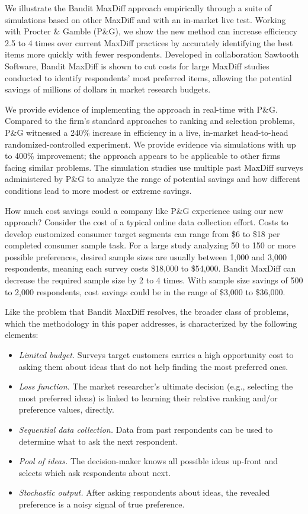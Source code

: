 \documentclass[nonblindrev]{informs3}
\begin{document}
We illustrate the Bandit MaxDiff approach empirically through a suite of simulations based on other MaxDiff and with an in-market live test. Working with Procter \& Gamble (P\&G), we show the new method can increase efficiency 2.5 to 4 times over current MaxDiff practices by accurately identifying the best items more quickly with fewer respondents. Developed in collaboration Sawtooth Software, Bandit MaxDiff is shown to cut costs for large MaxDiff studies conducted to identify respondents’ most preferred items, allowing the potential savings of millions of dollars in market research budgets. 

We provide evidence of implementing the approach in real-time with P\&G. Compared to the firm's standard approaches to ranking and selection problems, P\&G witnessed a 240\% increase in efficiency in a live, in-market head-to-head randomized-controlled experiment. We provide evidence via simulations with up to 400\% improvement; the approach appears to be applicable to other firms facing similar problems. The simulation studies use multiple past MaxDiff surveys administered by P\&G to analyze the range of potential savings and how different conditions lead to more modest or extreme savings.

How much cost savings could a company like P\&G experience using our new approach? Consider the cost of a typical online data collection effort. Costs to develop customized consumer target segments can range from \$6 to \$18 per completed consumer sample task. For a large study analyzing 50 to 150 or more possible preferences, desired sample sizes are usually between 1,000 and 3,000 respondents, meaning each survey costs \$18,000 to \$54,000. Bandit MaxDiff can decrease the required sample size by 2 to 4 times. With sample size savings of 500 to 2,000 respondents, cost savings could be in the range of \$3,000 to \$36,000.

Like the problem that Bandit MaxDiff resolves, the broader class of problems, which the methodology in this paper addresses, is characterized by the following elements:
\begin{itemize}
\item \emph{Limited budget.} Surveys target customers carries a high opportunity cost to asking them about ideas that do not help finding the most preferred ones.
\item \emph{Loss function.} The market researcher's ultimate decision (e.g., selecting the most preferred ideas) is linked to learning their relative ranking and/or preference values, directly.
\item \emph{Sequential data collection.} Data from past respondents can be used to determine what to ask the next respondent.
\item \emph{Pool of ideas.} The decision-maker knows all possible ideas up-front and selects which ask respondents about next.
\item \emph{Stochastic output.} After asking respondents about ideas, the revealed preference is a noisy signal of true preference.
\end{itemize}
\end{document}
